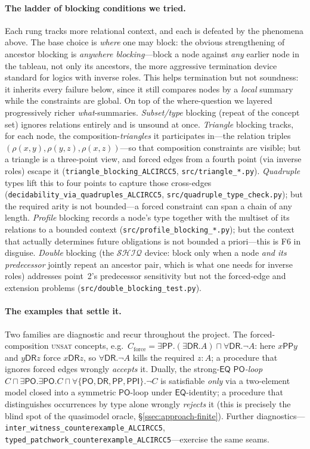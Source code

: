 \documentclass[11pt]{article}
\newcommand{\DR}{\mathsf{DR}}
\newcommand{\PO}{\mathsf{PO}}
\newcommand{\PP}{\mathsf{PP}}
\newcommand{\PPI}{\mathsf{PPI}}
\newcommand{\EQ}{\mathsf{EQ}}
\theoremstyle{plain}
\theoremstyle{definition}
\begin{document}
\paragraph{The ladder of blocking conditions we tried.} Each rung tracks
more relational context, and each is defeated by the phenomena above. The
base choice is \emph{where} one may block: the obvious strengthening of
ancestor blocking is \emph{anywhere blocking}---block a node against
\emph{any} earlier node in the tableau, not only its ancestors, the more
aggressive termination device standard for logics with inverse roles.
This helps termination but not soundness: it inherits every failure
below, since it still compares nodes by a \emph{local} summary while the
constraints are global. On top of the where-question we layered
progressively richer \emph{what}-summaries.
\emph{Subset/type} blocking (repeat of the concept set) ignores relations
entirely and is unsound at once. \emph{Triangle} blocking tracks, for each
node, the composition-\emph{triangles} it participates in---the relation
triples $(\rho(x,y),\rho(y,z),\rho(x,z))$---so that composition
constraints are visible; but a triangle is a three-point view, and forced
edges from a fourth point (via inverse roles) escape it
(\texttt{triangle\_blocking\_ALCIRCC5}, \texttt{src/triangle\_*.py}).
\emph{Quadruple} types lift this to four points to capture those
cross-edges (\texttt{decidability\_via\_quadruples\_ALCIRCC5},
\texttt{src/quadruple\_type\_check.py}); but the required arity is not
bounded---a forced constraint can span a chain of any length.
\emph{Profile} blocking records a node's type together with the multiset
of its relations to a bounded context
(\texttt{src/profile\_blocking\_*.py}); but the context that actually
determines future obligations is not bounded a priori---this is F6 in
disguise. \emph{Double} blocking (the $\mathcal{SHIQ}$ device: block only
when a node \emph{and its predecessor} jointly repeat an ancestor pair,
which is what one needs for inverse roles) addresses point~2's
predecessor sensitivity but not the forced-edge and extension problems
(\texttt{src/double\_blocking\_test.py}).

\paragraph{The examples that settle it.} Two families are diagnostic and
recur throughout the project. The forced-composition \textsc{unsat}
concepts, e.g.\
$C_{\mathrm{force}}=\exists\PP.(\exists\DR.A)\sqcap\forall\DR.\neg A$:
here $x\mathbin{\PP}y$ and $y\mathbin{\DR}z$ force $x\mathbin{\DR}z$, so
$\forall\DR.\neg A$ kills the required $z\!:\!A$; a procedure that ignores
forced edges wrongly \emph{accepts} it. Dually, the strong-$\EQ$
\emph{$\PO$-loop}
$C\sqcap\exists\PO.\exists\PO.C\sqcap\forall\{\PO,\DR,\PP,\PPI\}.\neg C$
is satisfiable \emph{only} via a two-element model closed into a symmetric
$\PO$-loop under $\EQ$-identity; a procedure that distinguishes occurrences
by type alone wrongly \emph{rejects} it (this is precisely the blind spot
of the quasimodel oracle, \S\ref{ssec:approach-finite}). Further
diagnostics---\texttt{inter\_witness\_counterexample\_ALCIRCC5},
\texttt{typed\_patchwork\_counterexample\_ALCIRCC5}---exercise the same
seams.
\end{document}
